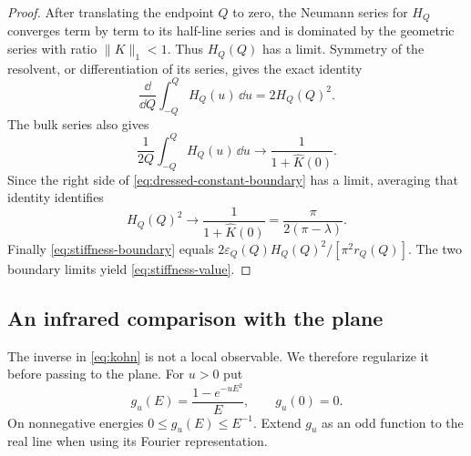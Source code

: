 \begin{proof}
After translating the endpoint \(Q\) to zero, the Neumann series for
\(H_Q\) converges term by term to its half-line series and is dominated
by the geometric series with ratio \(\|K\|_1<1\). Thus \(H_Q(Q)\) has
a limit. Symmetry of the resolvent, or differentiation of its series,
gives the exact identity
\begin{equation}\label{eq:dressed-constant-boundary}
 \frac{\dd}{\dd Q}\int_{-Q}^{Q}H_Q(u)\,\dd u=2H_Q(Q)^2.
\end{equation}
The bulk series also gives
\[
 \frac1{2Q}\int_{-Q}^{Q}H_Q(u)\,\dd u
       \longrightarrow\frac1{1+\widehat K(0)}.
\]
Since the right side of \eqref{eq:dressed-constant-boundary} has a limit,
averaging that identity identifies
\[
 H_Q(Q)^2\longrightarrow\frac1{1+\widehat K(0)}
       =\frac{\pi}{2(\pi-\lambda)}.
\]
Finally \eqref{eq:stiffness-boundary} equals
\(2\varepsilon_Q(Q)H_Q(Q)^2/[\pi^2r_Q(Q)]\).
The two boundary limits yield \eqref{eq:stiffness-value}.
\end{proof}

\subsection{An infrared comparison with the plane}

The inverse in \eqref{eq:kohn} is not a local observable.
We therefore regularize it before passing to the plane.
For \(u>0\) put
\[
 g_u(E)=\frac{1-e^{-uE^2}}{E},\qquad g_u(0)=0.
\]
On nonnegative energies \(0\le g_u(E)\le E^{-1}\).
Extend \(g_u\) as an odd function to the real line when using its
Fourier representation.

